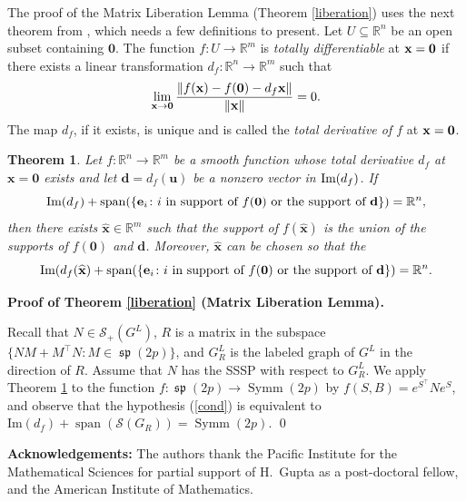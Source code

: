 \documentclass[12pt]{article}
\newtheorem{thm}{Theorem}[section]
\theoremstyle{definition}
\theoremstyle{definition}
\theoremstyle{definition}
\numberwithin{figure}{section}
\numberwithin{equation}{section}
\newcommand{\Span}{\operatorname{span}}
\newcommand{\symp}{\mathcal{S}_+}
\newcommand{\bx}{{\bf x}}
\newcommand{\symm}{\operatorname{Symm}}
\newcommand{\spLA}{\operatorname{\mathfrak{sp}}}
\newcommand{\noi}{\noindent}
\begin{document}
The proof of the Matrix Liberation Lemma (Theorem \ref{liberation}) uses the {next theorem} from \cite{CS}, which needs a few definitions to present. 
 Let $U\subseteq \mathbb{R}^n$
be an open subset containing $\mathbf 0 $. 
The function $f\colon U \rightarrow \mathbb{R}^m$ is \textit{totally differentiable} 
at $\bx = \mathbf 0$ if there exists a linear transformation $d_f\colon \mathbb{R}^n \rightarrow \mathbb{R}^m $ such that
\[
\lim_{{\bx}\rightarrow \mathbf 0} \frac{ \| f(\bx)-f(\mathbf 0) -d_f\bx \|}{\|{\bx}\|}= 0. 
\]
The map $d_f$, if it exists, is unique and is called the \textit{total derivative of $f$} at ${\bx}={\bf 0}$. 

\begin{thm} {\rm \cite{CS}}
\label{IVTLiberate}
Let $f\colon\mathbb{R}^n \rightarrow  
\mathbb{R}^m$ be a smooth function
whose total derivative  $d_f$ at $\mathbf x= \mathbf 0$ exists and  let $\mathbf d= d_f(\mathbf u)$ be a nonzero vector 
in $\mbox{\rm Im}({d_f})$. 
If 
\begin{equation}
\label{cond} 
\mbox{\rm Im}(d_f) + \Span(\{ \mathbf e_i\colon i \mbox{ in support of $f(\mathbf 0)$ or the support of $\mathbf d$}\})  
= \mathbb{R}^n,
\end{equation}
then there exists $\widehat{\mathbf{x}} \in \mathbb{R}^m$
such that the support of $f(\widehat{\mathbf{x}})$ 
is the union of 
the supports of $f(\mathbf 0)$ and $\mathbf d$.  Moreover, $\widehat{\mathbf{x}}$ 
can be chosen so that the 
\begin{equation}
\label{cond'}
\mbox{\rm Im}(
d_f({\widehat{\mathbf{x}}}) + \Span(\{ \mathbf e_i \colon i \mbox{ in support of $f(\mathbf 0)$ or the support of $\mathbf d$}\})  
= \mathbb{R}^n.
\end{equation}
\end{thm} 

\medskip
\noi
{\bf Proof of Theorem \ref{liberation} (Matrix Liberation Lemma).}

\medskip\noi
{Recall that $N\in\symp(G^L)$, $R$ is a matrix in the subspace $\{ NM + M^\top N \colon M \in \spLA(2p) \}$,
and  $G^L_R$ is the labeled graph of $G^L$ in the direction of $R$.}  Assume that $N$ has the SSSP { with respect to $G^L_R$}. 
We apply Theorem \ref{IVTLiberate} to the function  
$f\colon \spLA (2p)\rightarrow \symm(2p)$
by $f(S,B)=e^{S^\top}Ne^S$,  and observe that the hypothesis 
(\ref{cond}) is equivalent to 
$\mbox{Im}(d_f)+\Span(\mathcal{S}(G_{R}))= \symm(2p)$.  \qed 

\bigskip
\noindent
{\bf Acknowledgements:} 
The authors thank the Pacific Institute for the Mathematical Sciences for partial support of H.~Gupta as a post-doctoral fellow, and the American Institute of Mathematics. 
\end{document}

